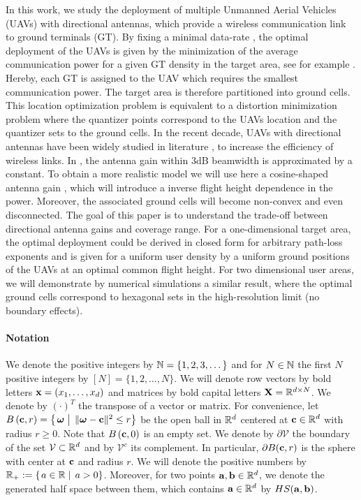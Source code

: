 \documentclass[smallabstract,smallcaptions]{dccpaper}
\newcounter{example}[section]
\newcommand{\Ball}{\ensuremath{B}}          %
\newcommand{\Vor}{\ensuremath{\mathcal{V}}}         %
\newcommand{\philippstart}{\color{black}}
\newcommand{\philippend}{\color{black}}
\begin{document}
%
In this work, we study the deployment of multiple Unmanned Aerial Vehicles (UAVs) with directional antennas, which
provide a wireless communication link to ground terminals (GT).  By fixing a minimal data-rate , the optimal deployment
of the UAVs is given by the minimization of the average communication power for a given GT density in the target area,
see for example \cite{Erdem}. Hereby, each GT is assigned to the UAV which requires the smallest communication power.
The target area is therefore partitioned into ground cells.  This location optimization problem is equivalent to a
distortion minimization problem where the quantizer points correspond to the UAVs location and the quantizer sets to the
ground cells.  In the recent decade, UAVs with directional antennas have been widely studied in literature
\cite{BJL,MSF,HA,KMR,HSYR,MWMM}, to increase the efficiency of wireless links.   In \cite{BJL,MSF,HA,KMR,HSYR,MWMM}, the
antenna gain within 3dB beamwidth is approximated by a constant. To obtain a more realistic model we will use here a
cosine-shaped antenna gain \cite{CAB2}, which will introduce a inverse flight height dependence in the power.  Moreover,
the associated ground cells will become non-convex and even disconnected.  The goal of this paper is to understand the
trade-off between directional antenna gains and coverage range. For a one-dimensional target area, the optimal
deployment could be derived in closed form for arbitrary path-loss exponents and is given for a uniform user density by
a uniform ground positions of the UAVs at an optimal common flight height. For two dimensional user areas, we will
demonstrate by numerical simulations a similar result, where the optimal ground cells correspond to hexagonal sets in
the high-resolution limit (no boundary effects). 

\philippstart \paragraph{Notation} We denote the positive integers by ${\mathbb N}=\{1,2,3,\dots\}$ and for $N\in{\ensuremath{\mathbb N}}$ the first
$N$ positive integers by $[N]=\{1,2,\dots,N\}$. We will denote row vectors by bold letters ${\mathbf x}=(x_1,\dots,x_d)$ and
matrices by bold capital letters ${\mathbf X}={\mathbb R}^{d\times N}$. We denote by $(\cdot)^T$ the transpose of a vector or matrix.
For convenience, let $\Ball\left(\vc,r\right)=\set{\vome}{\|\vome-\vc\|^2\le r}$ be the open ball in ${\mathbb R}^d$ centered at
${\mathbf c}\in{\ensuremath{\mathbb R}}^d$ with radius $r\geq 0$. Note that $\Ball\left(\vc,0\right)$ is an empty set. We denote by $\partial \Vor$ the
boundary of the set $\Vor\subset\R^d$ and by $\Vor^c$ its complement. In particular, $\partial \Ball(\vc,r)$ is the sphere
with center at ${\mathbf c}$ and radius $r$. We will denote the positive numbers by $\R_+:=\set{a\in\R}{a>0}$.
%
Moreover, for two points ${\mathbf a},{\mathbf b}\in{\ensuremath{\mathbb R}}^d$, we denote the generated half space between them, which contains ${\mathbf a}\in{\ensuremath{\mathbb R}}^d$
by $HS({\mathbf a}, {\mathbf b})$.  \philippend
\end{document}
